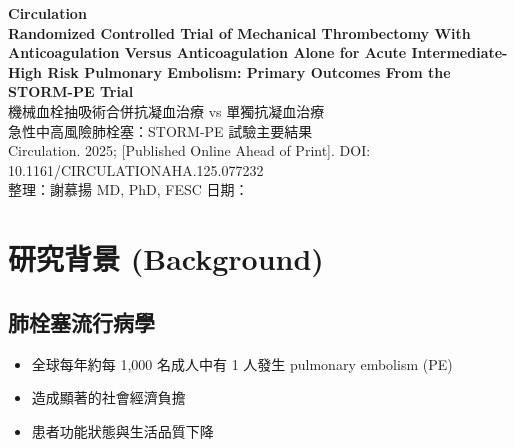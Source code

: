 \documentclass[11pt,a4paper]{article}
\begin{document}
\begin{center}
{\LARGE\bfseries\textcolor{emergency_red}{Circulation}}\\[0.5cm]
{\Large\textbf{Randomized Controlled Trial of Mechanical Thrombectomy With Anticoagulation Versus Anticoagulation Alone for Acute Intermediate-High Risk Pulmonary Embolism: Primary Outcomes From the STORM-PE Trial}}\\[0.3cm]
{\large 機械血栓抽吸術合併抗凝血治療 vs 單獨抗凝血治療\\急性中高風險肺栓塞：STORM-PE 試驗主要結果}\\[0.5cm]
{\normalsize Circulation. 2025; [Published Online Ahead of Print]. DOI: 10.1161/CIRCULATIONAHA.125.077232}\\[0.3cm]
{\normalsize 整理：謝慕揚 MD, PhD, FESC \quad 日期：\mydate}
\end{center}

\vspace{0.5cm}


\section{研究背景 (Background)}

\subsection{肺栓塞流行病學}
\begin{itemize}[leftmargin=*,itemsep=2pt]
    \item 全球每年約每 1,000 名成人中有 1 人發生 pulmonary embolism (PE)
    \item 造成顯著的社會經濟負擔
    \item 患者功能狀態與生活品質下降
\end{itemize}
\end{document}
